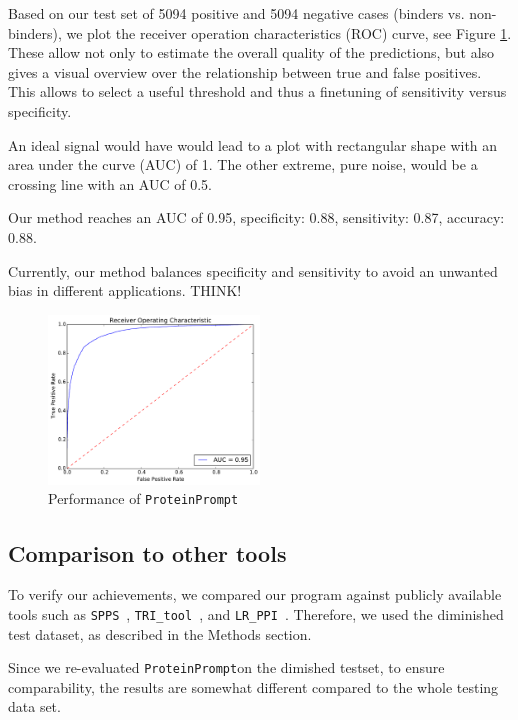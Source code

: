 \documentclass[preprint,3p,times,twocolumn]{elsarticle}
\newcommand{\TODO}[1] {\begingroup\color{red}#1\endgroup}
\newcommand{\spps}{\texttt{SPPS}}
\newcommand{\tri}{\texttt{TRI\_tool}}
\newcommand{\lr}{\texttt{LR\_PPI}}
\newcommand{\tool}{\texttt{ProteinPrompt}\hspace{2pt}}
\begin{document}
Based on our test set of 5094 positive and 5094 negative cases
(binders vs. non-binders), we plot the receiver operation
characteristics (ROC) curve, see Figure \ref{fig:roc}. These allow not
only to estimate the overall quality of the predictions, but also
gives a visual overview over the relationship between true and false
positives. This allows to select a useful threshold and thus a
finetuning of sensitivity versus specificity.

An ideal signal would have would lead to a plot with rectangular shape
with an area under the curve (AUC) of 1. The other extreme, pure noise, would be a crossing
line with an AUC of 0.5.

Our method reaches an AUC of 0.95,
specificity: 0.88,
sensitivity: 0.87,
accuracy: 0.88.

Currently, our method balances specificity and sensitivity to avoid an
unwanted bias in different applications. \TODO{THINK!} 

\begin{figure}[t]
\includegraphics[width=0.5\textwidth]{img/meta_final_roc.pdf}
\caption{Performance of \tool}
\label{fig:roc}
\end{figure} 



\subsection{Comparison to other tools}

To verify our achievements, we compared our program against publicly
available tools such as \spps\ \cite{Liu:2012}, \tri\
\cite{Perovic:2017}, and \lr\ \cite{Pan:2010}. Therefore, we used the
diminished test dataset, as described in the Methods section. 

Since we re-evaluated \tool on the dimished testset, to ensure
comparability, the results are somewhat different compared to the
whole testing data set. 
\end{document}
